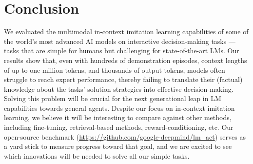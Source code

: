 \section{Conclusion}
\label{sec:conclusion}

We evaluated the multimodal in-context imitation learning capabilities of some of the world's most advanced AI models on interactive decision-making tasks --- tasks that are simple for humans but challenging for state-of-the-art LMs.
Our results show that, even with hundreds of demonstration episodes, context lengths of up to one million tokens, and thousands of output tokens, models often struggle to reach expert performance, thereby failing to translate their (factual) knowledge about the tasks' solution strategies into effective decision-making.
Solving this problem will be crucial for the next generational leap in LM capabilities towards general agents.
Despite our focus on in-context imitation learning, we believe it will be interesting to compare against other methods, including fine-tuning, retrieval-based methods, reward-conditioning, etc.
Our open-source benchmark (\url{https://github.com/google-deepmind/lm_act}) serves as a yard stick to measure progress toward that goal, and we are excited to see which innovations will be needed to solve all our simple tasks.

